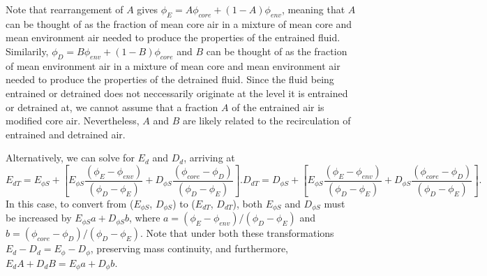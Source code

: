 \documentclass[12pt]{article}
\begin{document}
Note that rearrangement of $A$ gives 
$\phi_E = A \phi_{core} + (1-A)\phi_{env}$, meaning that $A$ can be 
thought of as the fraction of mean core air in a mixture of mean 
core and mean environment air needed to produce the properties of the entrained 
fluid.  Similarily, $\phi_D = B \phi_{env} + (1-B)\phi_{core}$ and 
$B$ can be thought of as the fraction of mean environment air in a mixture of 
mean core and mean environment air needed to produce the properties of the 
detrained fluid.  Since the fluid being entrained or detrained does not 
neccessarily originate at the level it is entrained or detrained at, we cannot 
assume that a fraction $A$ of the entrained air is modified core air.  
Nevertheless, $A$ and $B$ are likely related to the recirculation of entrained 
and detrained air.

Alternatively, we can solve for $E_d$ and $D_d$, arriving at
\begin{subequations}
\begin{equation}
  \label{eq:corrected_entrainment2}
    E_{d T} = E_{\phi S} 
        + \left[E_{\phi S}\frac{(\phi_E - \phi_{env})}
                               {(\phi_D - \phi_E)} 
              + D_{\phi S}\frac{(\phi_{core} - \phi_D)}
                               {(\phi_D - \phi_E)}\right].
\end{equation}
\begin{equation}
  \label{eq:corrected_detrainment2}
    D_{d T} = D_{\phi S} 
        + \left[E_{\phi S}\frac{(\phi_E - \phi_{env})}
                               {(\phi_D - \phi_E)}
              + D_{\phi S}\frac{(\phi_{core} - \phi_D)}
                               {(\phi_D - \phi_E)}\right].
\end{equation}
\end{subequations}
In this case, to convert from ($E_{\phi S}$, $D_{\phi S}$) to
($E_{dT}$, $D_{dT}$), both $E_{\phi S}$ and $D_{\phi S}$ must be
increased by $E_{\phi S} a + D_{\phi S} b$, where 
$a = (\phi_E - \phi_{env})/(\phi_D - \phi_E)$ and 
$b = (\phi_{core} -\phi_D)/(\phi_D - \phi_E)$.  Note that under both these
transformations $E_d-D_d = E_{\phi}-D_{\phi}$, preserving mass
continuity, and furthermore, $E_d A + D_d B = E_{\phi} a + D_{\phi}
b$.
\end{document}
